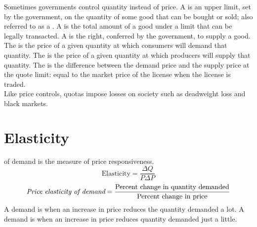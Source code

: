 \documentclass{article}
\begin{document}
Sometimes governments control quantity instead of price. A  is an upper limit, set by the government, on the quantity of some good that can be bought or sold; also referred to as a . A  is the total amount of a good under a limit that can be legally transacted. A  is the right, conferred by the government, to supply a good. \\ 

The  is the price of a given quantity at which consumers will demand that quantity. The  is the price of a given quantity at which producers will supply that quantity. The  is the difference between the demand price and the supply price at the quote limit: equal to the market price of the license when the license is traded. \\ 

Like price controls, quotas impose losses on society such as deadweight loss and black markets. 

\section{Elasticity}

 of demand is the measure of price responsiveness. $$\textrm{Elasticity} = \frac{\Delta Q}{P\Delta P}$$ $$\emph{Price elasticity of demand} = \frac{\textrm{Percent change in quantity demanded}}{\textrm{Percent change in price}}$$ A demand is  when an increase in price reduces the quantity demanded a lot. A demand is  when an increase in price reduces quantity demanded just a little. \\ 
\end{document}
